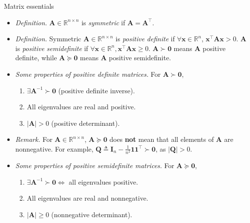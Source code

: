 \documentclass{beamer}
\numberwithin{equation}{section}
\begin{document}
\begin{frame}{Matrix essentials}
    \begin{itemize}
        \item
        \textit{Definition.} $ \mathbf{A} \in \mathbb{R}^{n \times n} $ is
        \textit{symmetric} if $ \mathbf{A} = \mathbf{A}^\top $.

        \item
        \textit{Definition.} Symmetric $ \mathbf{A} \in
        \mathbb{R}^{n \times n} $ is \textit{positive definite} if
        $ \forall \mathbf{x} \in \mathbb{R}^n $, $ \mathbf{x}^\top
        \mathbf{Ax} > 0 $. $ \mathbf{A} $ is \textit{positive semidefinite}
        if $ \forall \mathbf{x} \in \mathbb{R}^n,
        \mathbf{x}^\top\mathbf{Ax} \ge 0 $. $ \mathbf{A} \succ \mathbf{0} $
        means $ \mathbf{A} $ positive definite, while $ \mathbf{A}
        \succeq \mathbf{0} $ means $ \mathbf{A} $ positive semidefinite.

        \item
        \textit{Some properties of positive definite matrices.} For
        $ \mathbf{A} \succ \mathbf{0} $,
        \begin{enumerate}
            \item
            $ \exists \mathbf{A}^{-1} \succ \mathbf{0} $ (positive definite
            inverse).

            \item
            All eigenvalues are real and positive.

            \item
            $ |\mathbf{A}| > 0 $ (positive determinant).
        \end{enumerate}

        \item
        \textit{Remark.} For $ \mathbf{A} \in \mathbb{R}^{n \times n} $,
        $ \mathbf{A} \succeq \mathbf{0} $ does \textbf{not} mean that all
        elements of $ \mathbf{A} $ are nonnegative. For example,
        $ \mathbf{Q} \triangleq \mathbf{I}_n - \frac{1}{n^2}\mathbf{11}^\top
        \succ \mathbf{0} $, as $ |\mathbf{Q}| > 0 $.

        \item
        \textit{Some properties of positive semidefinite matrices.} For
        $ \mathbf{A} \succeq \mathbf{0} $,
        \begin{enumerate}
            \item
            $ \exists \mathbf{A}^{-1} \succ \mathbf{0} \Leftrightarrow $ all
            eigenvalues positive.

            \item
            All eigenvalues are real and nonnegative.

            \item
            $ |\mathbf{A}| \ge 0 $ (nonnegative determinant).
        \end{enumerate}
    \end{itemize}
\end{frame}
\end{document}
